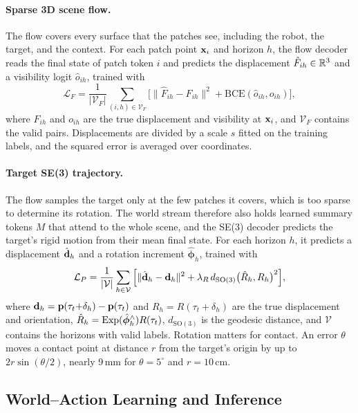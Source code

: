 \paragraph{Sparse 3D scene flow.}
The flow covers every surface that the patches see, including the robot, the target,
and the context. For each patch point $\mathbf{x}_i$ and horizon $h$, the flow decoder reads
the final state of patch token $i$ and predicts the displacement $\hat F_{ih}\in\mathbb{R}^3$ and
a visibility logit $\hat o_{ih}$, trained with
\begin{equation}
\mathcal L_F=\frac1{|\mathcal V_F|}\sum_{(i,h)\in\mathcal V_F}\!
\big[\|\hat F_{ih}-F_{ih}\|^2+\mathrm{BCE}(\hat o_{ih},o_{ih})\big],
\label{eq:flowloss}
\end{equation}
where $F_{ih}$ and $o_{ih}$ are the true displacement and visibility at $\mathbf{x}_i$, and
$\mathcal V_F$ contains the valid pairs. Displacements are divided by a scale $s$ fitted
on the training labels, and the squared error is averaged over coordinates.

\paragraph{Target SE(3) trajectory.}
The flow samples the target only at the few patches it covers, which is too sparse to
determine its rotation. The world stream therefore also holds \cfgMetaTokens{} learned
summary tokens $M$ that attend to the whole scene, and the SE(3) decoder predicts the
target's rigid motion from their mean final state. For each horizon $h$, it predicts a displacement
$\hat{\mathbf{d}}_h$ and a rotation increment $\hat{\boldsymbol\phi}_h$, trained with
\begin{equation}
\mathcal L_P=\frac1{|\mathcal V|}\sum_{h\in\mathcal V}\Big[\|\hat{\mathbf{d}}_h-\mathbf{d}_h\|^2
+\lambda_R\,d_{\mathrm{SO}(3)}\big(\hat R_h,R_h\big)^2\Big],
\label{eq:poseloss}
\end{equation}
where $\mathbf{d}_h=\mathbf{p}(\tau_t{+}\delta_h)-\mathbf{p}(\tau_t)$ and
$R_h=R(\tau_t{+}\delta_h)$ are the true displacement and orientation,
$\hat R_h=\operatorname{Exp}(\hat{\boldsymbol\phi}_h^\wedge)R(\tau_t)$, $d_{\mathrm{SO}(3)}$ is the
geodesic distance, and $\mathcal V$ contains the horizons with valid labels.
Rotation matters for contact. An error $\theta$ moves a contact point at distance $r$
from the target's origin by up to $2r\sin(\theta/2)$, nearly 9\,mm for $\theta=5^\circ$
and $r=10$\,cm.

\subsection{World--Action Learning and Inference}
\label{sec:act}

